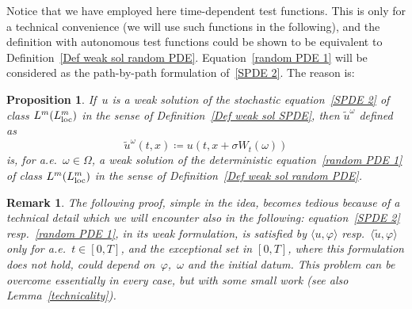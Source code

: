 \documentclass[a4paper,10pt]{article}
\newtheorem{proposition}[theorem]{Proposition}
\newtheorem{remark}[theorem]{Remark}
\newcommand\1{\mathbbm{1}}
\newcommand{\lan}{\langle}
\newcommand{\ran}{\rangle}
\newcommand{\td}{\tilde}
\newcommand\loc{{\rm loc}}
\numberwithin{equation}{section}
\begin{document}
Notice that we have employed here time-dependent test functions. This is only for a technical convenience (we will use such functions in the following), and the definition with autonomous test functions could be shown to be equivalent to Definition~\ref{Def weak sol random PDE}. Equation~\eqref{random PDE 1} will be considered as the path-by-path
formulation of~\eqref{SPDE 2}. The reason is:

\begin{proposition}
\label{Prop equivalence}
If~$u$ is a weak solution of the stochastic equation~\eqref{SPDE 2} of class $L^{m}(L^{m}_\loc)$ in the sense of Definition~\ref{Def weak sol SPDE}, then $\widetilde{u}^{\omega}$ defined as
\begin{equation*}
\widetilde{u}^{\omega}(t,x)  \coloneqq u(t,x+\sigma W_{t}(\omega))
\end{equation*}
is, for a.e.~$\omega\in\Omega$, a weak solution of the deterministic equation~\eqref{random PDE 1} of class $L^{m}(L^{m}_\loc)$ in the sense of Definition~\ref{Def weak sol random PDE}.
\end{proposition}

\begin{remark}\label{techrmk}
The following proof, simple in the idea, becomes tedious because of a technical detail which we will encounter also in the following: equation~\eqref{SPDE 2} resp.~\eqref{random PDE 1}, in its weak formulation, is satisfied by $\lan u,\varphi\ran$ resp.~$\lan\td{u},\varphi\ran$ only for a.e.~$t \in [0,T]$, and the exceptional set in $[0,T]$, where this formulation does not hold, could depend on~$\varphi$,~$\omega$ and the initial datum. This problem can be overcome essentially in every case, but with some small work \textup{(}see also Lemma~\ref{technicality}\textup{)}.
\end{remark}
\end{document}
